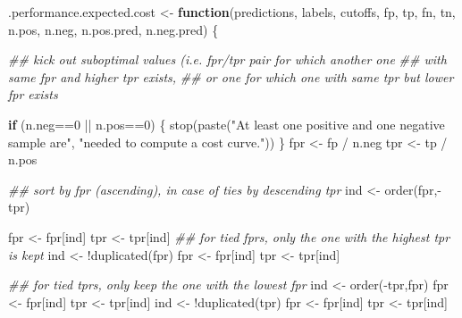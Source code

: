 \documentclass[
  letterpaper,
  DIV=11,
  numbers=noendperiod]{scrartcl}
\newenvironment{Shaded}{\begin{snugshade}}{\end{snugshade}}
\newcommand{\ControlFlowTok}[1]{\textcolor[rgb]{0.00,0.23,0.31}{\textbf{#1}}}
\newcommand{\DecValTok}[1]{\textcolor[rgb]{0.68,0.00,0.00}{#1}}
\newcommand{\DocumentationTok}[1]{\textcolor[rgb]{0.37,0.37,0.37}{\textit{#1}}}
\newcommand{\FunctionTok}[1]{\textcolor[rgb]{0.28,0.35,0.67}{#1}}
\newcommand{\NormalTok}[1]{\textcolor[rgb]{0.00,0.23,0.31}{#1}}
\newcommand{\OtherTok}[1]{\textcolor[rgb]{0.00,0.23,0.31}{#1}}
\newcommand{\SpecialCharTok}[1]{\textcolor[rgb]{0.37,0.37,0.37}{#1}}
\newcommand{\StringTok}[1]{\textcolor[rgb]{0.13,0.47,0.30}{#1}}
\begin{document}
\begin{Shaded}
\begin{Highlighting}[]
\NormalTok{.performance.expected.cost }\OtherTok{\textless{}{-}}
  \ControlFlowTok{function}\NormalTok{(predictions, labels, cutoffs, fp, tp, fn, tn,}
\NormalTok{           n.pos, n.neg, n.pos.pred, n.neg.pred) \{}
      
      \DocumentationTok{\#\# kick out suboptimal values (i.e. fpr/tpr pair for which another one}
      \DocumentationTok{\#\# with same fpr and higher tpr exists, }
      \DocumentationTok{\#\# or one for which one with same tpr but lower fpr exists}

      \ControlFlowTok{if}\NormalTok{ (n.neg}\SpecialCharTok{==}\DecValTok{0} \SpecialCharTok{||}\NormalTok{ n.pos}\SpecialCharTok{==}\DecValTok{0}\NormalTok{) \{}
          \FunctionTok{stop}\NormalTok{(}\FunctionTok{paste}\NormalTok{(}\StringTok{"At least one positive and one negative sample are"}\NormalTok{,}
                     \StringTok{"needed to compute a cost curve."}\NormalTok{))}
\NormalTok{      \}}
\NormalTok{      fpr }\OtherTok{\textless{}{-}}\NormalTok{ fp }\SpecialCharTok{/}\NormalTok{ n.neg}
\NormalTok{      tpr }\OtherTok{\textless{}{-}}\NormalTok{ tp }\SpecialCharTok{/}\NormalTok{ n.pos}

      \DocumentationTok{\#\# sort by fpr (ascending), in case of ties by descending tpr}
\NormalTok{      ind }\OtherTok{\textless{}{-}} \FunctionTok{order}\NormalTok{(fpr,}\SpecialCharTok{{-}}\NormalTok{tpr)}
      
\NormalTok{      fpr }\OtherTok{\textless{}{-}}\NormalTok{ fpr[ind]}
\NormalTok{      tpr }\OtherTok{\textless{}{-}}\NormalTok{ tpr[ind]}
      \DocumentationTok{\#\# for tied fprs, only the one with the highest tpr is kept}
\NormalTok{      ind }\OtherTok{\textless{}{-}} \SpecialCharTok{!}\FunctionTok{duplicated}\NormalTok{(fpr)}
\NormalTok{      fpr }\OtherTok{\textless{}{-}}\NormalTok{ fpr[ind]}
\NormalTok{      tpr }\OtherTok{\textless{}{-}}\NormalTok{ tpr[ind]}

      \DocumentationTok{\#\# for tied tprs, only keep the one with the lowest fpr}
\NormalTok{      ind }\OtherTok{\textless{}{-}} \FunctionTok{order}\NormalTok{(}\SpecialCharTok{{-}}\NormalTok{tpr,fpr)}
\NormalTok{      fpr }\OtherTok{\textless{}{-}}\NormalTok{ fpr[ind]}
\NormalTok{      tpr }\OtherTok{\textless{}{-}}\NormalTok{ tpr[ind]}
\NormalTok{      ind }\OtherTok{\textless{}{-}} \SpecialCharTok{!}\FunctionTok{duplicated}\NormalTok{(tpr)}
\NormalTok{      fpr }\OtherTok{\textless{}{-}}\NormalTok{ fpr[ind]}
\NormalTok{      tpr }\OtherTok{\textless{}{-}}\NormalTok{ tpr[ind]}


\end{Highlighting}
\end{Shaded}
\end{document}
